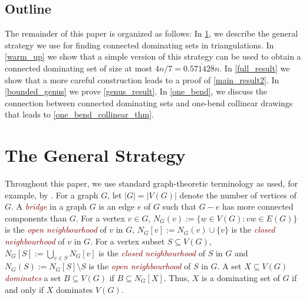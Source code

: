 \documentclass{article}
\newcommand{\pat}[1]{\textcolor{red}{PM: #1}}
\newcommand{\defin}[1]{\emph{\textcolor{Maroon}{#1}}}
\theoremstyle{definition}
\begin{document}

\subsection{Outline}

The remainder of this paper is organized as follows:  In \cref{strategy}, we describe the general strategy we use for finding connected dominating sets in triangulations.  In \cref{warm_up} we show that a simple version of this strategy can be used to obtain a connected dominating set of size at most $4n/7= 0.\overline{571428}n$.
In \cref{full_result} we show that a more careful construction leads to a proof of \cref{main_result2}.  In \cref{bounded_genus} we prove \cref{genus_result}.  In \cref{one_bend}, we discuss the connection between connected dominating sets and one-bend collinear drawings that leads to \cref{one_bend_collinear_thm}.



%


\section{The General Strategy}
\label{strategy}

Throughout this paper, we use standard graph-theoretic terminology as used, for example, by \citet{diestel:graph}.
For a graph $G$, let $|G|=|V(G)|$ denote the number of vertices of $G$.  A \defin{bridge} in a graph $G$ is an edge $e$ of $G$ such that $G-e$ has more connected components than $G$.  For a vertex $v\in G$, $N_G(v):=\{w\in V(G):vw\in E(G)\}$ is the \defin{open neighbourhood} of $v$ in $G$,  $N_G[v]:=N_G(v)\cup\{v\}$ is the \defin{closed neighbourhood} of $v$ in $G$.  For a vertex subset $S\subseteq V(G)$, $N_G[S]:=\bigcup_{v\in S} N_{G}[v]$ is the \defin{closed neighbourhood} of $S$ in $G$ and $N_G(S):=N_G[S]\setminus S$ is the \defin{open neighbourhood} of $S$ in $G$.  A set $X\subseteq V(G)$ \defin{dominates} a set $B\subseteq V(G)$ if $B\subseteq N_G[X]$.  Thus, $X$ is a dominating set of $G$ if and only if $X$ dominates $V(G)$.
\end{document}
